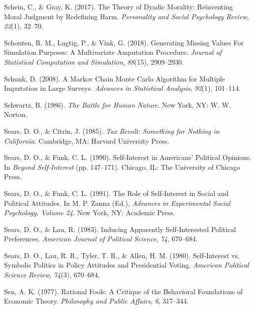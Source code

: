 \documentclass[12pt,econ]{sources/authesis}
\begin{document}
\leavevmode\hypertarget{ref-schein_2017_theory}{}%
Schein, C., \& Gray, K. (2017). The Theory of Dyadic Morality: Reinventing Moral Judgment by Redefining Harm. \emph{Personality and Social Psychology Review}, \emph{22}(1), 32--70.

\leavevmode\hypertarget{ref-schouten_2018_generating}{}%
Schouten, R. M., Lugtig, P., \& Vink, G. (2018). Generating Missing Values For Simulation Purposes: A Multivariate Amputation Procedure. \emph{Journal of Statistical Computation and Simulation}, \emph{88}(15), 2909--2930.

\leavevmode\hypertarget{ref-schunk_2008_markov}{}%
Schunk, D. (2008). A Markov Chain Monte Carlo Algorithm for Multiple Imputation in Large Surveys. \emph{Advances in Statistical Analysis}, \emph{92}(1), 101--114.

\leavevmode\hypertarget{ref-schwartz_battle_1986}{}%
Schwartz, B. (1986). \emph{The Battle for Human Nature}. New York, NY: W. W. Norton.

\leavevmode\hypertarget{ref-sears_tax_1985}{}%
Sears, D. O., \& Citrin, J. (1985). \emph{Tax Revolt: Something for Nothing in California}. Cambridge, MA: Harvard University Press.

\leavevmode\hypertarget{ref-sears_self-interest_1990}{}%
Sears, D. O., \& Funk, C. L. (1990). Self-Interest in Americans' Political Opinions. In \emph{Beyond Self-Interest} (pp. 147--171). Chicago, IL: The University of Chicago Press.

\leavevmode\hypertarget{ref-sears_role_1991}{}%
Sears, D. O., \& Funk, C. L. (1991). The Role of Self-Interest in Social and Political Attitudes. In M. P. Zanna (Ed.), \emph{Advances in Experimental Social Psychology, Volume 24}. New York, NY: Academic Press.

\leavevmode\hypertarget{ref-sears_inducing_1983}{}%
Sears, D. O., \& Lau, R. (1983). Inducing Apparently Self-Interested Political Preferences. \emph{American Journal of Political Science}, \emph{74}, 670--684.

\leavevmode\hypertarget{ref-sears_self-interest_1980}{}%
Sears, D. O., Lau, R. R., Tyler, T. R., \& Allen, H. M. (1980). Self-Interest vs. Symbolic Politics in Policy Attitudes and Presidential Voting. \emph{American Political Science Review}, \emph{74}(3), 670--684.

\leavevmode\hypertarget{ref-sen_rational_1977}{}%
Sen, A. K. (1977). Rational Fools: A Critique of the Behavioral Foundations of Economic Theory. \emph{Philosophy and Public Affairs}, \emph{6}, 317--344.
\end{document}
